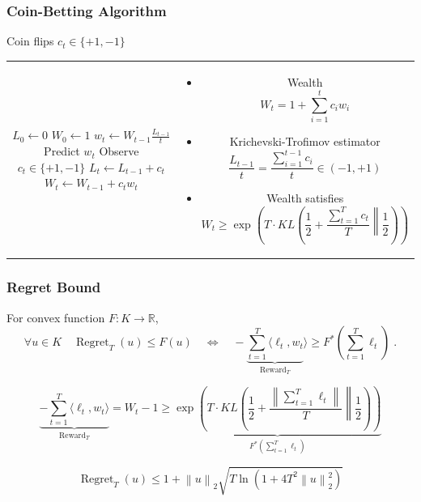 \documentclass[usenames,dvipsnames]{beamer}
\DeclareMathOperator{\Regret}{Regret}
\DeclareMathOperator{\Reward}{Reward}
\newcommand{\R}{\mathbb{R}}
\newcommand{\norm}[1]{\left\|#1\right\|}
\newcommand{\KL}[2]{KL\left({#1}\middle\|{#2}\right)}
\begin{document}
\begin{frame}
\frametitle{Coin-Betting Algorithm}

\fontsize{10pt}{14}\selectfont

Coin flips $c_t \in \{+1,-1\}$

\vspace{0.5cm}

\begin{tabular}{c|c}
\begin{minipage}{4.3cm}
\begin{algorithmic}
{
\STATE $L_0 \leftarrow 0$
\STATE $W_0 \leftarrow 1$
\FOR{$t=1,2,3,\dots$}
\STATE $w_t \leftarrow W_{t-1} \frac{L_{t-1}}{t} $
\STATE Predict $w_t$
\STATE Observe $c_t \in \{+1,-1\}$
\STATE $L_t \leftarrow L_{t-1} + c_t$
\STATE $W_t \leftarrow W_{t-1} + c_t w_t$
\ENDFOR
}
\end{algorithmic}
\end{minipage}
&
\begin{minipage}{5.7cm}
\pause
\begin{itemize}
\item Wealth
$$
W_t = 1 + \sum_{i=1}^t c_i w_i
$$

\item Krichevski-Trofimov estimator
$$
\frac{L_{t-1}}{t} = \frac{\sum_{i=1}^{t-1} c_i}{t}  \in (-1,+1)
$$

\item Wealth satisfies
$$
W_t \ge \exp \left( T \cdot \KL{\frac{1}{2} + \frac{\sum_{t=1}^T c_t}{T}}{\frac{1}{2}} \right)
$$
\end{itemize}
\end{minipage}
\end{tabular}
\end{frame}

\begin{frame}
\frametitle{Regret Bound}

\begin{theorem}
For convex function $F:K \to \R$,
$$
\forall u \in K \quad \Regret_T(u) \le F(u)
\quad \Longleftrightarrow \quad
- \underbrace{\sum_{t=1}^T \langle \ell_t, w_t}_{\Reward_T} \rangle \ge F^* \left(\sum_{t=1}^T \ell_t \right) \; .
$$
\end{theorem}
\pause
\vspace{-0.5cm}
$$
\underbrace{-\sum_{t=1}^T \langle \ell_t, w_t \rangle}_{\Reward_T}
= W_t - 1
\ge \underbrace{\exp \left( T \cdot \KL{\frac{1}{2} + \frac{\norm{\sum_{t=1}^T \ell_t}}{T}}{\frac{1}{2}} \right)}_{F^*(\sum_{t=1}^T \ell_t)}
$$

\pause

\begin{theorem}
$$
\Regret_T(u) \le 1 + \norm{u}_2 \sqrt{T \ln\left(1 + 4T^2 \norm{u}_2^2 \right)}
$$
\end{theorem}

\end{frame}
\end{document}
